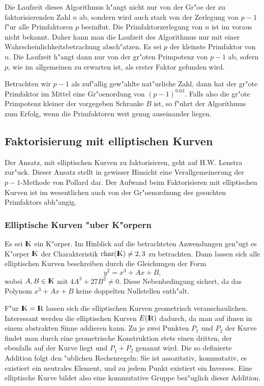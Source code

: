 Die Laufzeit dieses Algorithmus h"angt nicht nur von der Gr"o\3e der
zu faktorisierenden Zahl $n$ ab, sondern wird auch stark von der
Zerlegung von $p-1$ f"ur alle Primfaktoren $p$ beeinflu\3t. Die
Primfaktorzerlegung von $n$ ist im voraus nicht bekannt. Daher kann
man die Laufzeit des Algorithmus nur mit einer
Wahrscheinlichkeitsbetrachung absch"atzen. Es sei $p$ der kleinste
Primfaktor von $n$. Die Laufzeit h"angt dann nur von der gr"o\3ten
Primpotenz von $p-1$ ab, sofern $p$, wie im allgemeinen zu erwarten
ist, als erster Faktor gefunden wird.

Betrachten wir $p-1$ als zuf"allig gew"ahlte nat"urliche Zahl, dann
hat der gr"o\3te Primfaktor im Mittel eine Gr"o\3enordung von
$(p-1)^{0.63}$. Falls also die gr"o\3te Primpotenz kleiner der
vorgegeben Schranke $B$ ist, so f"uhrt der Algorithmus zum Erfolg,
wenn die Primfaktoren weit genug auseinander liegen.

\subsection{Faktorisierung mit elliptischen Kurven}

Der Ansatz, mit elliptischen Kurven zu faktorisieren, geht auf
H.W. Lenstra zur"uck. Dieser Ansatz stellt in gewisser Hinsicht eine
Verallgemeinerung der $p-1$-Methode von Pollard dar. Der Aufwand beim
Faktorisieren mit elliptischen Kurven ist im wesentlichen auch von der
Gr"o\3enordnung des gesuchten Primfaktors abh"angig.


\subsubsection{Elliptische Kurven "uber K"orpern}

Es sei $\K$ ein K"orper. Im Hinblick auf die betrachteten Anwendungen
gen"ugt es K"orper $\K$ der Charakteristik $\mbox{char}(\K)\neq 2,3$
zu betrachten. Dann lassen sich alle elliptischen Kurven beschreiben
durch die Gleichungen der Form
\begin{equation} 
  y^2 = x^3 + Ax + B, 
\end{equation}
wobei $A,B\in\K$ mit $4A^3 + 27B^2 \neq 0$. Diese Nebenbedingung
sichert, da\3 das Polynom $x^3 + Ax + B$ keine doppelten Nullstellen
enth"alt.

F"ur $\K=\R$ lassen sich die elliptischen Kurven geometrisch
veranschaulichen. Interessant werden die
elliptischen Kurven $E(\R)$ dadurch, da\3 man auf ihnen in einem
abstrakten Sinne addieren kann. Zu je zwei Punkten $P_1$ und $P_2$ der
Kurve findet man durch eine geometrische Konstruktion stets einen
dritten, der ebenfalls auf der Kurve liegt und $P_1 + P_2$ genannt
wird. Die so definierte Addition folgt den "ublichen Rechenregeln: Sie
ist assozitativ, kommutativ, es existiert ein neutrales Element, und zu
jedem Punkt existiert ein Inverses. Eine elliptische Kurve bildet also
eine kommutative Gruppe bez"uglich dieser Addition.


